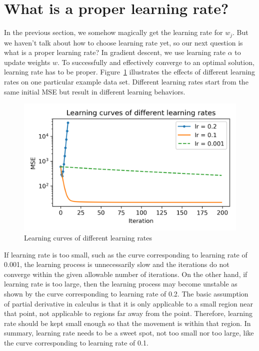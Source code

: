 \documentclass[
	letterpaper
]{article}
\begin{document}
\section{What is a proper learning rate?}
In the previous section, we somehow magically get the learning rate for $w_j$.
But we haven't talk about how to choose learning rate yet, so our next question is what is a proper learning rate?
In gradient descent, we use learning rate $\alpha$ to update weights $w$.
To successfully and effectively converge to an optimal solution, learning rate has to be proper.
Figure~\ref{fig:difflr} illustrates the effects of different learning rates on one particular example data set.
Different learning rates start from the same initial MSE but result in different learning behaviors.
\begin{figure}[htbp]
	\centering
	\includegraphics[width=3.5 in]{figures/diff-learning-rates.png}
	\caption{Learning curves of different learning rates}
	\label{fig:difflr}
\end{figure}

If learning rate is too small, such as the curve corresponding to learning rate of 0.001, the learning process is unnecessarily slow and the iterations do not converge within the given allowable number of iterations.
On the other hand, if learning rate is too large, then the learning process may become unstable as shown by the curve corresponding to learning rate of 0.2.
The basic assumption of partial derivative in calculus is that it is only applicable to a small region near that point, not applicable to regions far away from the point.
Therefore, learning rate should be kept small enough so that the movement is within that region.
In summary, learning rate needs to be a sweet spot, not too small nor too large, like the curve corresponding to learning rate of 0.1.
\end{document}
